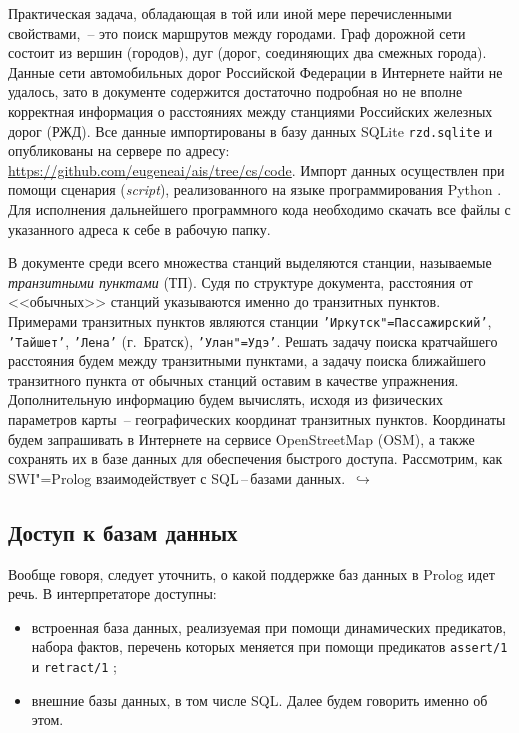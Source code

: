 \documentclass[a4paper,14pt, openany, twoside, final]{extbook} %
\newcommand{\eeng}[1]{\emph{\foreignlanguage{english}{#1}}}
\newcommand{\nnn}[2][ncolor]{\noindent%
\textcolor{eclr}{!\ [}\textcolor{#1}{#2}\textcolor{eclr}{]}}
\newcommand{\goforth}[1]{$\,\hookrightarrow$\pageref{#1}}
\begin{document}

Практическая задача, обладающая в той или иной мере перечисленными свойствами,~-- это поиск маршрутов между городами.  Граф дорожной сети состоит из вершин (городов), дуг (дорог, соединяющих два смежных города).  Данные сети автомобильных дорог Российской Федерации в Интернете найти не удалось, зато в документе \cite{rzhddb} содержится достаточно подробная но не вполне корректная информация о расстояниях между станциями Российских железных дорог (РЖД).  Все данные импортированы в базу данных SQLite  \texttt{rzd.sqlite} и опубликованы на сервере по адресу: \url{https://github.com/eugeneai/ais/tree/cs/code}.  Импорт данных осуществлен при помощи сценария (\eeng{script}), реализованного на языке программирования Python \cite{pythondoc,pythondl,pythonbook}.  Для исполнения дальнейшего программного кода необходимо скачать все файлы с указанного адреса к себе в рабочую папку.

В документе \cite{rzhddb} среди всего множества станций выделяются станции, называемые \emph{транзитными пунктами} (ТП).  Судя по структуре документа, расстояния от <<обычных>> станций указываются именно до транзитных пунктов.  Примерами транзитных пунктов являются станции \texttt{'Иркутск"=Пассажирский'}, \texttt{'Тайшет'}, \texttt{'Лена'} (г.~Братск), \texttt{'Улан"=Удэ'}.  Решать задачу поиска кратчайшего расстояния будем между транзитными пунктами, а задачу поиска ближайшего транзитного пункта от обычных станций оставим в качестве упражнения.  Дополнительную информацию будем вычислять, исходя из физических параметров карты~-- географических координат транзитных пунктов.  Координаты будем запрашивать в Интернете на сервисе \foreignlanguage{english}{Open\-Street\-Map} (OSM), а также сохранять их в базе данных для обеспечения быстрого доступа.  Рассмотрим, как SWI"=Pro\-log взаимодействует с SQL\,--\,ба\-за\-ми данных. \goforth{par:informedcont}

\subsection{Доступ к базам данных}
\label{sec:dbms}

Вообще говоря, следует уточнить, о какой поддержке баз данных в Prolog идет речь.  В интерпретаторе доступны:
\begin{itemize}
\item встроенная база данных, реализуемая при помощи динамических предикатов, набора фактов, перечень которых меняется при помощи предикатов \texttt{assert/1} и \texttt{retract/1} \cite{Bratko};
\item внешние базы данных, в том числе SQL.  Далее будем говорить именно об этом.
\end{itemize}
\end{document}
